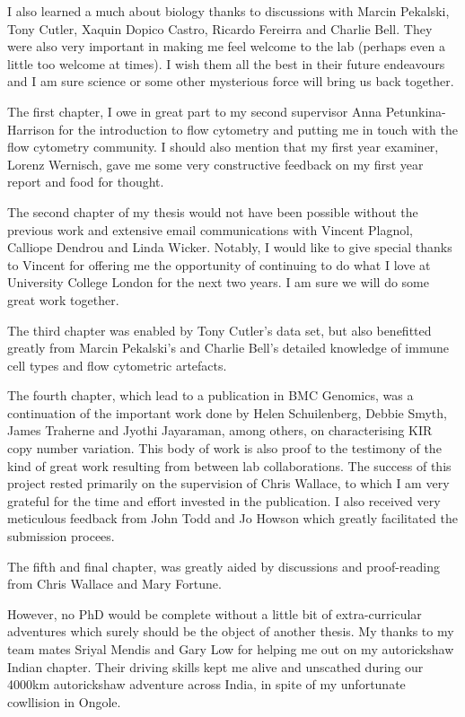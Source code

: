 \begin{acknowledgements}
 I also learned a much about biology thanks to discussions with Marcin Pekalski, Tony Cutler, Xaquin Dopico Castro, Ricardo Fereirra and Charlie Bell.
 They were also very important in making me feel welcome to the lab (perhaps even a little too welcome at times).
 I wish them all the best in their future endeavours and I am sure science or some other mysterious force will bring us back together.

 The first chapter, I owe in great part to my second supervisor Anna Petunkina-Harrison for the introduction to flow cytometry and putting me in touch with the flow cytometry community.
 I should also mention that my first year examiner, Lorenz Wernisch, gave me some very constructive feedback on my first year report and food for thought.

 The second chapter of my thesis would not have been possible without the previous work and extensive email communications with Vincent Plagnol, Calliope Dendrou and Linda Wicker.
 Notably, I would like to give special thanks to Vincent for offering me the opportunity of continuing to do what I love at University College London for the next two years.
 I am sure we will do some great work together.

 The third chapter was enabled by Tony Cutler's data set, but also benefitted greatly from Marcin Pekalski's and Charlie Bell's detailed knowledge of immune cell types and flow cytometric artefacts.

 The fourth chapter, which lead to a publication in BMC Genomics, was a continuation of the important work done by Helen Schuilenberg, Debbie Smyth, James Traherne and Jyothi Jayaraman, among others, on characterising KIR copy number variation.
 This body of work is also proof to the testimony of the kind of great work resulting from between lab collaborations.
 The success of this project rested primarily on the supervision of Chris Wallace, to which I am very grateful for the time and effort invested in the publication.
 I also received very meticulous feedback from John Todd and Jo Howson which greatly facilitated the submission procees.

 The fifth and final chapter, was greatly aided by discussions and proof-reading from Chris Wallace and Mary Fortune.

 However, no PhD would be complete without a little bit of extra-curricular adventures which surely should be the object of another thesis.
 My thanks to my team mates Sriyal Mendis and Gary Low for helping me out on my autorickshaw Indian chapter.
 Their driving skills kept me alive and unscathed during our 4000km autorickshaw adventure across India, in spite of my unfortunate cowllision in Ongole.


\end{acknowledgements}

